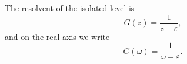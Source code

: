 \documentclass{article}
\begin{document}
The resolvent of the isolated level is
\begin{equation}
G(z) = \frac{1}{z-\varepsilon} ,
\label{eq:gz}
\end{equation}
and on the real axis we write
\begin{equation}
G(\omega) = \frac{1}{\omega-\varepsilon} .
\label{eq:gw}
\end{equation}
\end{document}
